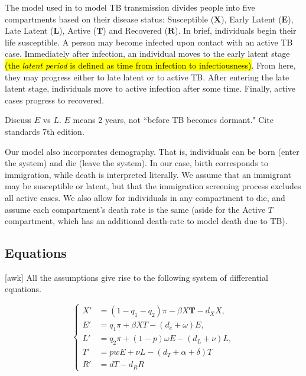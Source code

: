 \documentclass[sn-mathphys,Numbered]{sn-jnl}%
\newcommand{\cX}{\mathbf{X}}
\newcommand{\cE}{\mathbf{E}}
\newcommand{\cL}{\mathbf{L}}
\newcommand{\cT}{\mathbf{T}}
\newcommand{\cR}{\mathbf{R}}
\theoremstyle{thmstyleone}%
\theoremstyle{thmstyletwo}%
\theoremstyle{thmstylethree}%
\begin{document}
The model used in \cite{Guo2011PersistentLatency} to model TB transmission divides people into five compartments based on their disease status: Susceptible ($\cX$), Early Latent ($\cE$), Late Latent ($\cL$), Active ($\cT$) and Recovered ($\cR$). In brief, individuals begin their life susceptible. A person may become infected upon contact with an active TB case. Immediately after infection, an individual moves to the early latent stage \hl{(the \textit{latent period} is defined as time from infection to infectiousness\cite{InfectiousHandbook})}. From here, they may progress either to late latent or to active TB. After entering the late latent stage, individuals move to active infection after some time. Finally, active cases progress to recovered. 



Discuss $E$ vs $L$.  $E$ means 2 years, not ``before TB becomes dormant." Cite standards 7th edition.

Our model also incorporates demography. That is, individuals can be born (enter the system) and die (leave the system). In our case, birth corresponds to immigration, while death is interpreted literally. We assume that an immigrant may be susceptible or latent, but that the immigration screening process excludes all active cases. We also allow for individuals in any compartment to die, and assume each compartment's death rate is the same (aside for the Active $T$ compartment, which has an additional death-rate to model death due to TB).

\subsection{Equations}

[awk] All the assumptions give rise to the following system of differential equations.

\begin{equation}
    \begin{cases}
        X' &= (1-q_1-q_2)\pi - \beta X \cT - d_X X, \\
        E' &= q_1 \pi + \beta XT - (d_e+\omega)E,\\
        L' &= q_2 \pi + (1-p)\omega E - (d_L + \nu) L,\\
        T' &= pwE + \nu L -(d_T+\alpha+\delta) T \\
        R' &= dT - d_R R
    \end{cases}
    \label{eq:model}
\end{equation}
\end{document}
